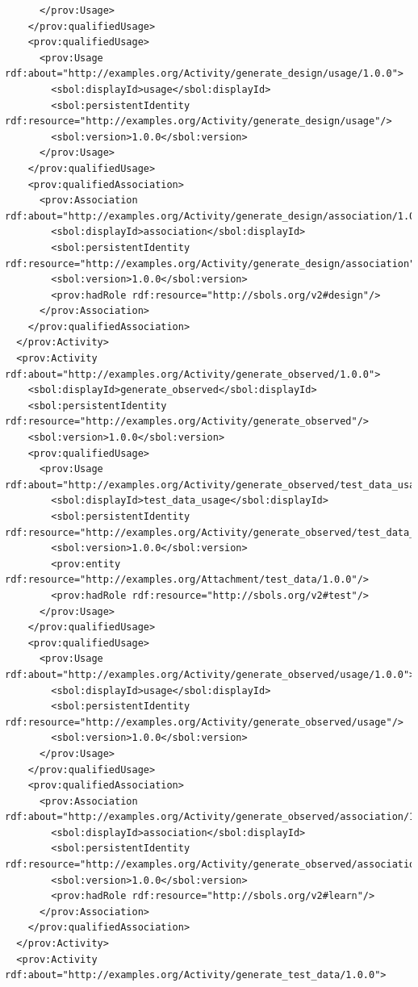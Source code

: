 \begin{lstlisting}
      </prov:Usage>
    </prov:qualifiedUsage>
    <prov:qualifiedUsage>
      <prov:Usage rdf:about="http://examples.org/Activity/generate_design/usage/1.0.0">
        <sbol:displayId>usage</sbol:displayId>
        <sbol:persistentIdentity rdf:resource="http://examples.org/Activity/generate_design/usage"/>
        <sbol:version>1.0.0</sbol:version>
      </prov:Usage>
    </prov:qualifiedUsage>
    <prov:qualifiedAssociation>
      <prov:Association rdf:about="http://examples.org/Activity/generate_design/association/1.0.0">
        <sbol:displayId>association</sbol:displayId>
        <sbol:persistentIdentity rdf:resource="http://examples.org/Activity/generate_design/association"/>
        <sbol:version>1.0.0</sbol:version>
        <prov:hadRole rdf:resource="http://sbols.org/v2#design"/>
      </prov:Association>
    </prov:qualifiedAssociation>
  </prov:Activity>
  <prov:Activity rdf:about="http://examples.org/Activity/generate_observed/1.0.0">
    <sbol:displayId>generate_observed</sbol:displayId>
    <sbol:persistentIdentity rdf:resource="http://examples.org/Activity/generate_observed"/>
    <sbol:version>1.0.0</sbol:version>
    <prov:qualifiedUsage>
      <prov:Usage rdf:about="http://examples.org/Activity/generate_observed/test_data_usage/1.0.0">
        <sbol:displayId>test_data_usage</sbol:displayId>
        <sbol:persistentIdentity rdf:resource="http://examples.org/Activity/generate_observed/test_data_usage"/>
        <sbol:version>1.0.0</sbol:version>
        <prov:entity rdf:resource="http://examples.org/Attachment/test_data/1.0.0"/>
        <prov:hadRole rdf:resource="http://sbols.org/v2#test"/>
      </prov:Usage>
    </prov:qualifiedUsage>
    <prov:qualifiedUsage>
      <prov:Usage rdf:about="http://examples.org/Activity/generate_observed/usage/1.0.0">
        <sbol:displayId>usage</sbol:displayId>
        <sbol:persistentIdentity rdf:resource="http://examples.org/Activity/generate_observed/usage"/>
        <sbol:version>1.0.0</sbol:version>
      </prov:Usage>
    </prov:qualifiedUsage>
    <prov:qualifiedAssociation>
      <prov:Association rdf:about="http://examples.org/Activity/generate_observed/association/1.0.0">
        <sbol:displayId>association</sbol:displayId>
        <sbol:persistentIdentity rdf:resource="http://examples.org/Activity/generate_observed/association"/>
        <sbol:version>1.0.0</sbol:version>
        <prov:hadRole rdf:resource="http://sbols.org/v2#learn"/>
      </prov:Association>
    </prov:qualifiedAssociation>
  </prov:Activity>
  <prov:Activity rdf:about="http://examples.org/Activity/generate_test_data/1.0.0">

\end{lstlisting}
